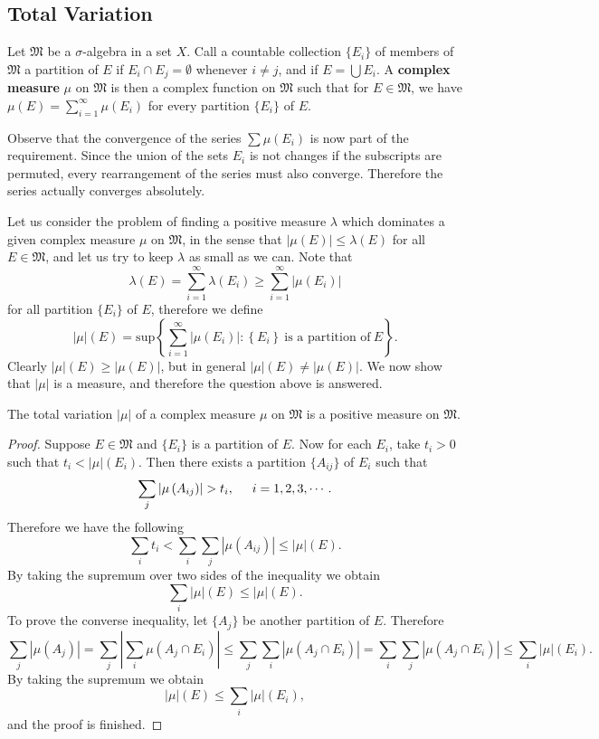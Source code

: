 \subsection{Total Variation}
Let $\mathfrak{M}$ be a $\sigma$-algebra in a set $X$. Call a countable collection $\{E_i\}$ of members of $\mathfrak{M}$ a partition of $E$ if $E_i\cap E_j=\emptyset$ whenever $i\ne j$, and if $E=\bigcup E_i$. A \textbf{complex measure} $\mu$ on $\mathfrak{M}$ is then a complex function on $\mathfrak{M}$ such that for $E\in\mathfrak{M}$, we have $\mu(E)=\sum_{i=1}^\infty\mu(E_i)$ for every partition $\{E_i\}$ of $E$.\par
Observe that the convergence of the series $\sum\mu(E_i)$ is now part of the requirement. Since the union of the sets $E_i$ is not changes if the subscripts are permuted, every rearrangement of the series must also converge. Therefore the series actually converges absolutely.\par
Let us consider the problem of finding a positive measure $\lambda$ which dominates a given complex measure $\mu$ on $\mathfrak{M}$, in the sense that $|\mu(E)|\le\lambda(E)$ for all $E\in\mathfrak{M}$, and let us try to keep $\lambda$ as small as we can. Note that 
$$
\lambda \left( E \right) =\sum_{i=1}^{\infty}{\lambda \left( E_i \right)}\ge \sum_{i=1}^{\infty}{\left| \mu \left( E_i \right) \right|}
$$
for all partition $\{E_i\}$ of $E$, therefore we define 
$$
\left| \mu \right|\left( E \right) =\mathrm{sup}\left\{ \sum_{i=1}^{\infty}{\left| \mu \left( E_i \right) \right|}:\left\{ E_i \right\}\ \text{is a partition of} \ E\right\} .
$$
Clearly $|\mu|(E)\ge|\mu(E)|$, but in general $|\mu|(E)\ne|\mu(E)|$. We now show that $|\mu|$ is a measure, and therefore the question above is answered.
\begin{theorem}
The total variation $|\mu|$ of a complex measure $\mu$ on $\mathfrak{M}$ is a positive measure on $\mathfrak{M}$.
\end{theorem}
\begin{proof}
Suppose $E\in\mathfrak{M}$ and $\{E_i\}$ is a partition of $E$. Now for each $E_i$, take $t_i>0$ such that $t_i<|\mu|(E_i)$. Then there exists a partition $\{A_{ij}\}$ of $E_i$ such that 
$$
\sum_j{\left| \mu \left( A_{ij} \right) \right|}>t_i,\hspace{0.5cm}i=1,2,3,\cdots .
$$
Therefore we have the following 
$$
\sum_i{t_i}<\sum_i{\sum_j{\left| \mu \left( A_{ij} \right) \right|}}\le \left| \mu \right|\left( E \right) .
$$
By taking the supremum over two sides of the inequality we obtain 
$$
\sum_i{\left| \mu \right|\left( E \right)}\le \left| \mu \right|\left( E \right) .
$$
To prove the converse inequality, let $\{A_j\}$ be another partition of $E$. Therefore 
$$
\sum_j{\left| \mu \left( A_j \right) \right|}=\sum_j{\left| \sum_i{\mu \left( A_j\cap E_i \right)} \right|}\le \sum_j{\sum_i{\left| \mu \left( A_j\cap E_i \right) \right|}}=\sum_i{\sum_j{\left| \mu \left( A_j\cap E_i \right) \right|}}\le \sum_i{\left| \mu \right|\left( E_i \right)}.
$$
By taking the supremum we obtain 
$$
\left| \mu \right|\left( E \right) \le \sum_i{\left| \mu \right|\left( E_i \right)},
$$
and the proof is finished.
\end{proof}
